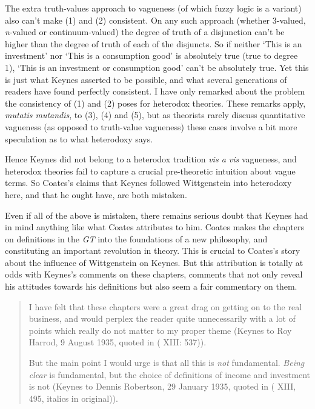 \documentclass[
  11pt,
  letterpaper,
  DIV=11,
  numbers=noendperiod,
  twoside]{scrartcl}
\begin{document}
The extra truth-values approach to vagueness (of which fuzzy logic is a
variant) also can't make (1) and (2) consistent. On any such approach
(whether 3-valued, \emph{n}-valued or continuum-valued) the degree of
truth of a disjunction can't be higher than the degree of truth of each
of the disjuncts. So if neither `This is an investment' nor `This is a
consumption good' is absolutely true (true to degree 1), `This is an
investment or consumption good' can't be absolutely true. Yet this is
just what Keynes asserted to be possible, and what several generations
of readers have found perfectly consistent. I have only remarked about
the problem the consistency of (1) and (2) poses for heterodox theories.
These remarks apply, \emph{mutatis mutandis}, to (3), (4) and (5), but
as theorists rarely discuss quantitative vagueness (as opposed to
truth-value vagueness) these cases involve a bit more speculation as to
what heterodoxy says.

Hence Keynes did not belong to a heterodox tradition \emph{vis a vis}
vagueness, and heterodox theories fail to capture a crucial
pre-theoretic intuition about vague terms. So Coates's claims that
Keynes followed Wittgenstein into heterodoxy here, and that he ought
have, are both mistaken.

Even if all of the above is mistaken, there remains serious doubt that
Keynes had in mind anything like what Coates attributes to him. Coates
makes the chapters on definitions in the \emph{GT} into the foundations
of a new philosophy, and constituting an important revolution in theory.
This is crucial to Coates's story about the influence of Wittgenstein on
Keynes. But this attribution is totally at odds with Keynes's comments
on these chapters, comments that not only reveal his attitudes towards
his definitions but also seem a fair commentary on them.

\begin{quote}
I have felt that these chapters were a great drag on getting on to the
real business, and would perplex the reader quite unnecessarily with a
lot of points which really do not matter to my proper theme (Keynes to
Roy Harrod, 9 August 1935, quoted in ( XIII: 537)).

But the main point I would urge is that all this is \emph{not}
fundamental. \emph{Being clear} is fundamental, but the choice of
definitions of income and investment is not (Keynes to Dennis Robertson,
29 January 1935, quoted in ( XIII,
495, italics in original)).
\end{quote}
\end{document}
